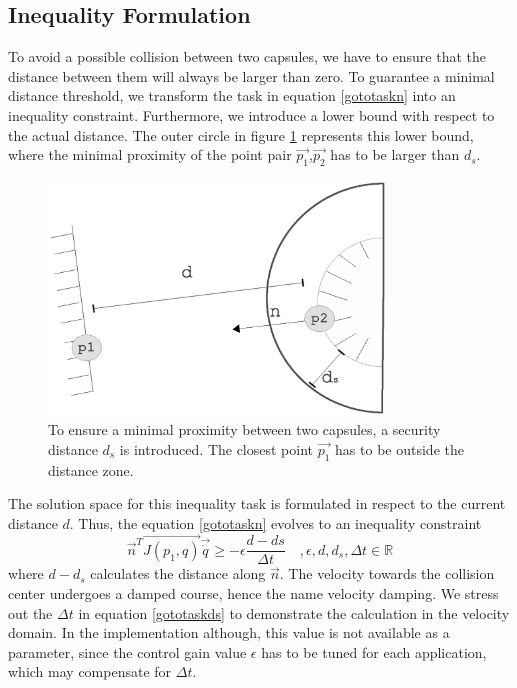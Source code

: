 \newpage
\subsection{Inequality Formulation}
To avoid a possible collision between two capsules, we have to ensure that the distance between them will always be larger than zero. To guarantee a minimal distance threshold, we transform the task in equation \ref{gototaskn} into an inequality constraint. Furthermore, we introduce a lower bound with respect to the actual distance. The outer circle in figure \ref{figcapsuledistanceds} represents this lower bound, where the minimal proximity of the point pair $\vec{p_1}$,$\vec{p_2}$ has to be larger than $d_s$.
\begin{figure}[h!]
  \centering
    \includegraphics[width=0.8\textwidth]{../figures/capsuledistanceds.eps}
    \caption{To ensure a minimal proximity between two capsules, a security distance $d_s$ is introduced. The closest point $\vec{p_1}$ has to be outside the distance zone.}
    \label{figcapsuledistanceds}
\end{figure}
The solution space for this inequality task is formulated in respect to the current distance $d$. Thus, the equation \ref{gototaskn} evolves to an inequality constraint
\begin{equation}\label{gototaskds}
\vec{n}^T\vec{J(p_1,q)} \vec{\dot{q}} \geq - \epsilon \frac{d - ds}{\Delta t}\quad , \epsilon, d, d_s, \Delta t \in \mathbb{R}
\end{equation}
where $d-d_s$ calculates the distance along $\vec{n}$. The velocity towards the collision center undergoes a damped course, hence the name velocity damping.
We stress out the $\Delta t$ in equation \ref{gototaskds} to demonstrate the calculation in the velocity domain. In the implementation although, this value is not available as a parameter, since the control gain value $\epsilon$ has to be tuned for each application, which may compensate for $\Delta t$. \\
